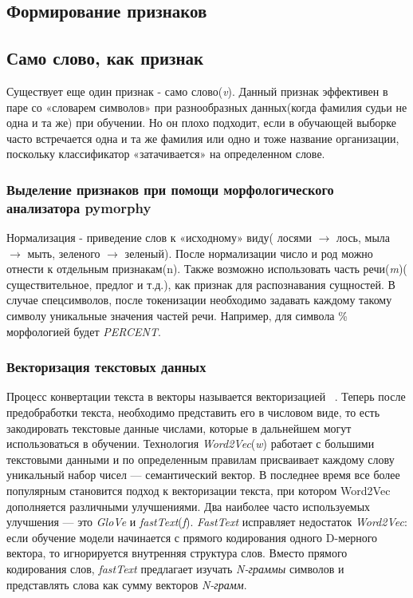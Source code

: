 \documentclass{csmathnotes}
\begin{document}
\subsection*{Формирование признаков}
\subsection*{Само слово, как признак}
Существует еще один признак - само слово(\emph{v}). Данный признак эффективен в паре со «словарем символов» при разнообразных данных(когда фамилия судьи не одна и та же) при обучении. Но он плохо подходит, если в обучающей выборке часто встречается одна и та же фамилия или одно и тоже название организации, поскольку классификатор «затачивается» на определенном слове.
\subsubsection*{Выделение признаков при помощи морфологического анализатора pymorphy}
Нормализация - приведение слов к «исходному» виду( лосями $\rightarrow$  лось, мыла $\rightarrow$ мыть, зеленого $\rightarrow$ зеленый). После нормализации число и род  можно отнести к отдельным признакам(n). Также возможно использовать часть речи(\emph{m})( существительное, предлог и т.д.), как признак для распознавания сущностей. В случае спецсимволов, после токенизации необходимо задавать каждому такому символу уникальные значения частей речи. Например, для символа \% морфологией будет \emph{PERCENT}.

 
\subsubsection*{Векторизация текстовых данных}
Процесс конвертации текста в векторы называется векторизацией~\cite{w2v} . Теперь после предобработки текста, необходимо представить его в числовом виде, то есть закодировать текстовые данные числами, которые в дальнейшем могут использоваться в обучении. Технология \emph{Word2Vec}(\emph{w}) работает с большими текстовыми данными и по определенным правилам присваивает каждому слову уникальный набор чисел — семантический вектор. В последнее время все более популярным становится подход к векторизации текста, при котором Word2Vec дополняется различными улучшениями. Два наиболее часто используемых улучшения — это \emph{GloVe} и \emph{fastText}(\emph{f}). \emph{FastText} исправляет недостаток \emph{Word2Vec}: если обучение модели начинается с прямого кодирования одного D-мерного вектора, то игнорируется внутренняя структура слов. Вместо прямого кодирования слов, \emph{fastText} предлагает изучать \emph{N-граммы} символов и представлять слова как сумму векторов \emph{N-грамм}.
\end{document}
